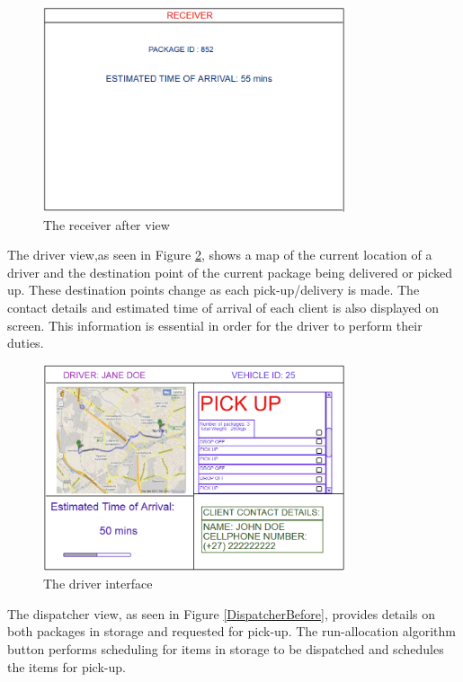 \documentclass[paper=a4, fontsize=11pt]{scrartcl} %
\numberwithin{equation}{section} %
\numberwithin{figure}{section} %
\numberwithin{table}{section} %
\begin{document}
\begin{figure}[hbt!]
\centering
\includegraphics[width=3.5in]{pictures/receiverAfter.png}
\caption{The receiver after view}
\label{receiverAfterView}
\end{figure}

The driver view,as seen in Figure \ref{DriverView}, shows a map of the current location of a driver and the destination point of the current package being delivered or picked up. These destination points change as each pick-up/delivery is made. The contact details and estimated time of arrival of each client is also displayed on screen. This information is essential in order for the driver to perform their duties.
\\


\begin{figure}[hbt!]
\centering
\includegraphics[width=3.5in]{pictures/driver.png}
\caption{The driver interface}
\label{DriverView}
\end{figure}

The dispatcher view, as seen in Figure \ref{DispatcherBefore}, provides details on both packages in storage and requested for pick-up. The run-allocation algorithm button performs scheduling for items in storage to be dispatched and schedules the items for pick-up. 
\\
\end{document}
